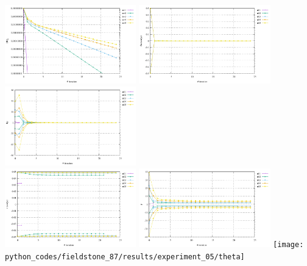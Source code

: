 \begin{center}
\includegraphics[width=5.7cm]{python_codes/fieldstone_87/results/experiment_05/conv}
\includegraphics[width=5.7cm]{python_codes/fieldstone_87/results/experiment_05/du}
\includegraphics[width=5.7cm]{python_codes/fieldstone_87/results/experiment_05/dp}\\
\includegraphics[width=5.7cm]{python_codes/fieldstone_87/results/experiment_05/v}
\includegraphics[width=5.7cm]{python_codes/fieldstone_87/results/experiment_05/p}
\texttt{[image: python\_codes/fieldstone\_87/results/experiment\_05/theta]}
\end{center}



\newpage
